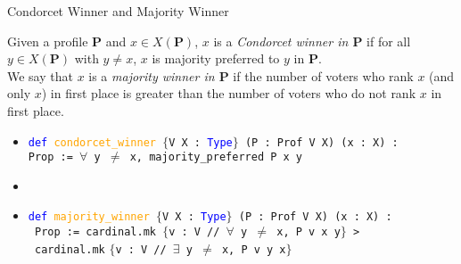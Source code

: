 \documentclass[12pt,xcolor=svgnames,blue,aspectratio=169]{beamer}
\begin{document}
\begin{frame}{Condorcet Winner and Majority Winner}

\begin{definition}\label{CondorcetDef} \textnormal{Given a profile $\mathbf{P}$ and $x\in X(\mathbf{P})$, $x$ is a \textit{Condorcet winner in $\mathbf{P}$} if for all $y\in X(\mathbf{P})$ with $y\neq x$, $x$ is majority preferred to $y$ in $\mathbf{P}$.\\[8pt] We say that $x$ is a \textit{majority winner in $\mathbf{P}$} if the number of voters who rank $x$ (and only $x$) in first place is greater than the number of voters who do not rank $x$ in first place.}
\end{definition}


\vfill 
\pause 
\begin{itemize}
\item[] \texttt{\textcolor{blue}{def} \textcolor{orange}{condorcet\_winner} $\{$V X : \textcolor{blue}{Type}$\}$ (P : Prof V X) (x : X) :} \\ \texttt{Prop := $\forall$ y $\neq$ x, majority\_preferred P x y}
\item[]
\item[] \texttt{\textcolor{blue}{def} \textcolor{orange}{majority\_winner} $\{$V X : \textcolor{blue}{Type}$\}$ (P : Prof V X) (x : X) :} \\
\texttt{ Prop := cardinal.mk $\{$v : V // $\forall$ y $\neq$ x, P v x y$\}$ > } \\\texttt{ cardinal.mk}  \texttt{$\{$v : V // $\exists$ y $\neq$ x, P v y x$\}$}
\end{itemize}

\end{frame}
\end{document}
